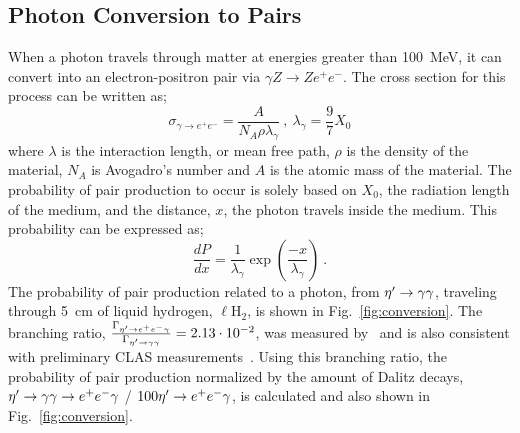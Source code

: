 \subsection{Photon Conversion to \epemT Pairs}\label{sec:intro.conversion}
When a photon travels through matter at energies greater than 100~MeV, it can convert into an electron-positron pair via $\gamma Z \rightarrow Ze^{+}e^{-}$. The cross section for this process can be written as;
\begin{equation}\label{pair_crosssection}
\sigma_{\gamma\rightarrow e^+e^-} =  \frac{A}{N_{A} \rho \lambda_\gamma}  \ ,\ \lambda_\gamma = \frac{9}{7}X_0
\end{equation}
where $\lambda$ is the interaction length, or mean free path, $\rho$ is the density of the material, $N_A$ is Avogadro's number and $A$ is the atomic mass of the material. The probability of pair production to occur is solely based on $X_{0}$, the radiation length of the medium, and the distance, $x$, the photon travels inside the medium. This probability can be expressed as;
\begin{equation}
\frac{dP}{dx} = \frac{1}{\lambda_\gamma}\exp(\frac{-x}{\lambda_\gamma}) \ .
\end{equation}
%
%
The probability of pair production related to a photon, from $\eta^{\prime} \to \gamma \gamma$, traveling through 5~cm of liquid hydrogen, $\ell$H$_2$, is shown in Fig.~\ref{fig:conversion}.
The branching ratio, $\frac{\Gamma_{\eta^{\prime} \to e^+e^- \gamma}}{\Gamma_{\eta^{\prime} \to \gamma \gamma}} = 2.13\cdot 10^{-2}$, was measured by~\cite{BESIII} and is also consistent with preliminary CLAS measurements~\cite{claskunkel}.
Using this branching ratio, the probability of pair production normalized by the amount of Dalitz decays,  $\eta^{\prime} \to \gamma \gamma \rightarrow e^+e^- \gamma$ / $100 \eta^{\prime} \rightarrow e^+e^- \gamma$, is calculated and also shown in Fig.~\ref{fig:conversion}. 
